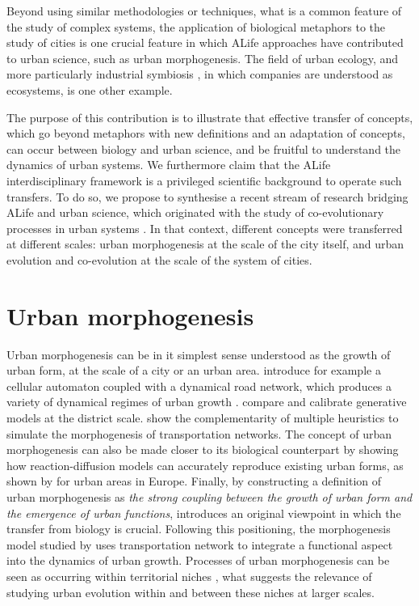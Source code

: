 \documentclass[letterpaper]{article}
\begin{document}
Beyond using similar methodologies or techniques, what is a common feature of the study of complex systems, the application of biological metaphors to the study of cities is one crucial feature in which ALife approaches have contributed to urban science, such as urban morphogenesis. The field of urban ecology, and more particularly industrial symbiosis \citep{chertow2007uncovering}, in which companies are understood as ecosystems, is one other example.

The purpose of this contribution is to illustrate that effective transfer of concepts, which go beyond metaphors with new definitions and an adaptation of concepts, can occur between biology and urban science, and be fruitful to understand the dynamics of urban systems. We furthermore claim that the ALife interdisciplinary framework is a privileged scientific background to operate such transfers. To do so, we propose to synthesise a recent stream of research bridging ALife and urban science, which originated with the study of co-evolutionary processes in urban systems \citep{raimbault2018caracterisation}. In that context, different concepts were transferred at different scales: urban morphogenesis at the scale of the city itself, and urban evolution and co-evolution at the scale of the system of cities.



\section{Urban morphogenesis}

Urban morphogenesis can be in it simplest sense understood as the growth of urban form, at the scale of a city or an urban area. \cite{raimbault2014hybrid} introduce for example a cellular automaton coupled with a dynamical road network, which produces a variety of dynamical regimes of urban growth \citep{raimbault2017identification}. \cite{raimbault2019generating} compare and calibrate generative models at the district scale. \cite{raimbault2018multi} show the complementarity of multiple heuristics to simulate the morphogenesis of transportation networks. The concept of urban morphogenesis can also be made closer to its biological counterpart by showing how reaction-diffusion models can accurately reproduce existing urban forms, as shown by \cite{raimbault2018calibration} for urban areas in Europe. Finally, by constructing a definition of urban morphogenesis as \emph{the strong coupling between the growth of urban form and the emergence of urban functions}, \cite{raimbault2018caracterisation} introduces an original viewpoint in which the transfer from biology is crucial. Following this positioning, the morphogenesis model studied by \cite{raimbault2019urban} uses transportation network to integrate a functional aspect into the dynamics of urban growth. Processes of urban morphogenesis can be seen as occurring within territorial niches \citep{holland2012signals}, what suggests the relevance of studying urban evolution within and between these niches at larger scales.
\end{document}

